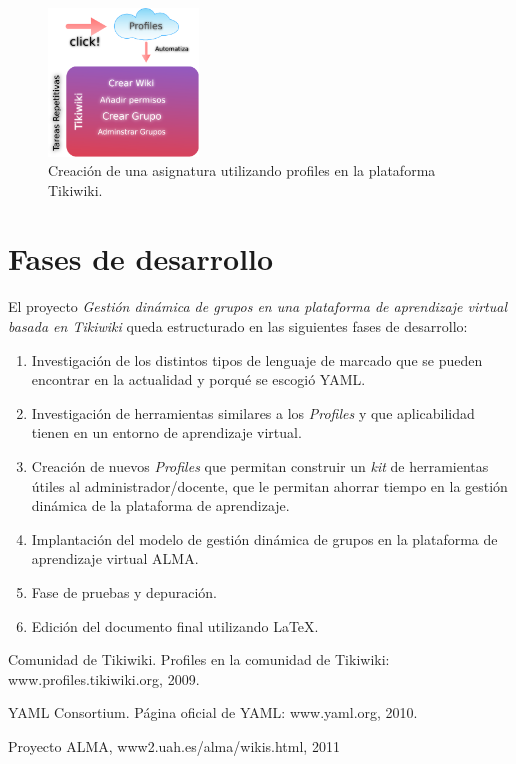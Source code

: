 \documentclass[12pt,oneside,a4paper]{article}
\begin{document}
\begin{figure}
  \centering
  \includegraphics[width=4cm]{figuras/anteproyecto1.eps}
  \caption{Creación de una asignatura utilizando profiles en la plataforma Tikiwiki.}
  \label{fig:ejemplo}
\end{figure}


\section{Fases de desarrollo}

El proyecto \textit{Gestión dinámica de grupos en una plataforma de aprendizaje virtual basada en Tikiwiki} queda estructurado en las siguientes fases de desarrollo:

\begin{enumerate}
    
    \item Investigación de los distintos tipos de lenguaje de marcado que se pueden encontrar en la actualidad y porqué se escogió YAML.

    \item Investigación de herramientas similares a los \textit{Profiles} y que aplicabilidad tienen en un entorno de aprendizaje virtual.

    \item Creación de nuevos \textit{Profiles} que permitan construir un \textit{kit} de herramientas útiles al administrador/docente, que le permitan ahorrar tiempo en la gestión dinámica de la plataforma de aprendizaje.

    \item Implantación del modelo de gestión dinámica de grupos en la plataforma de aprendizaje virtual ALMA\cite{ALMA}.

    \item Fase de pruebas y depuración.

    \item Edición del documento final utilizando \LaTeX.
\end{enumerate}

\begin{thebibliography}{9}
     Comunidad de Tikiwiki. Profiles en la comunidad de Tikiwiki: www.profiles.tikiwiki.org, 2009.

     YAML Consortium. Página oficial de YAML: www.yaml.org, 2010.
    
     Proyecto ALMA, www2.uah.es/alma/wikis.html, 2011

\end{thebibliography}
\end{document}
